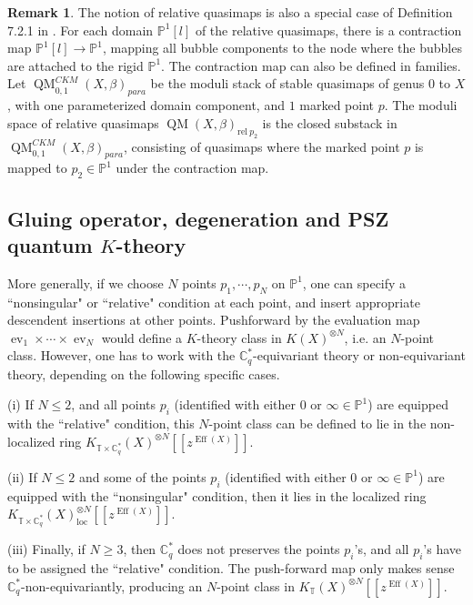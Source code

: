 \documentclass[10pt]{amsart}
\theoremstyle{definition}
\def\PP{{\mathbb{P}}}
\def\CC{{\mathbb{C}}}
\def\TT{\mathbb{T}}
\newcommand{\Eff}{\operatorname{Eff}}
\newcommand{\ev}{\operatorname{ev}}
\newcommand{\QM}{\operatorname{QM}}
\newcommand{\loc}{\mathrm{loc}}
\newcommand{\rel}{\mathrm{rel}}
\theoremstyle{definition}
\newtheorem{Remark}[Definition]{Remark}
\numberwithin{equation}{section}
\theoremstyle{Theorem}
\begin{document}
\begin{Remark}
The notion of relative quasimaps is also a special case of Definition 7.2.1 in \cite{CKM}. For each domain $\PP^1[l]$ of the relative quasimaps, there is a contraction map $\PP^1[l] \to \PP^1$, mapping all bubble components to the node where the bubbles are attached to the rigid $\PP^1$. The contraction map can also be defined in families. Let $\QM_{0, 1}^{CKM} (X, \beta)_{para}$ be the moduli stack of stable quasimaps of genus $0$ to $X$, with one parameterized domain component, and $1$ marked point $p$. The moduli space of relative quasimaps $\QM(X, \beta)_{\rel \ p_2}$ is the closed substack in $\QM_{0, 1}^{CKM} (X, \beta)_{para}$, consisting of quasimaps where the marked point $p$ is mapped to $p_2 \in \PP^1$ under the contraction map.
\end{Remark}

\subsection{Gluing operator, degeneration and PSZ quantum $K$-theory} \label{QK}

More generally, if we choose $N$ points $p_1, \cdots, p_N$ on $\PP^1$, one can specify a ``nonsingular" or ``relative" condition at each point, and insert appropriate descendent insertions at other points. Pushforward by the evaluation map $\ev_1\times \cdots \times \ev_N$ would define a $K$-theory class in $K(X)^{\otimes N}$, i.e. an $N$-point class. However, one has to work with the $\CC_q^*$-equivariant theory or non-equivariant theory, depending on the following specific cases.

(i) If $N\leq 2$, and all points $p_i$ (identified with either $0$ or $\infty\in \PP^1$) are equipped with the ``relative" condition, this $N$-point class can be defined to lie in the non-localized ring $K_{\TT\times \CC_q^*}(X)^{\otimes N} [[ z^{\Eff(X)} ]]$.

(ii) If $N\leq 2$ and some of the points $p_i$ (identified with either $0$ or $\infty \in \PP^1$) are equipped with the ``nonsingular" condition, then it lies in the localized ring $K_{\TT\times \CC_q^*}(X)_\loc^{\otimes N} [[ z^{\Eff(X)} ]]$.

(iii) Finally, if $N\geq 3$, then $\CC_q^*$ does not preserves the points $p_i$'s, and all $p_i$'s have to be assigned the ``relative" condition. The push-forward map only makes sense $\CC^*_q$-non-equivariantly, producing an $N$-point class in $K_{\TT}(X)^{\otimes N} [[ z^{\Eff(X)} ]]$.
\end{document}
